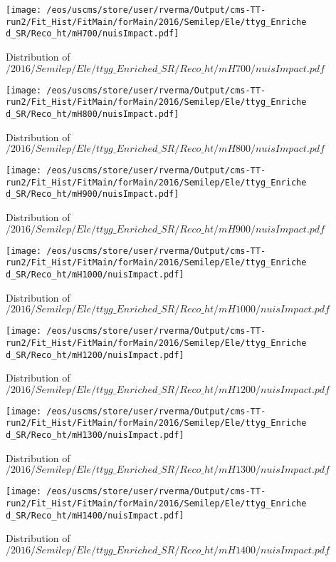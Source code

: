 \begin{figure}
\centering
\texttt{[image: /eos/uscms/store/user/rverma/Output/cms-TT-run2/Fit\_Hist/FitMain/forMain/2016/Semilep/Ele/ttyg\_Enriched\_SR/Reco\_ht/mH700/nuisImpact.pdf]}
\caption{Distribution of $/2016/Semilep/Ele/ttyg\_Enriched\_SR/Reco\_ht/mH700/nuisImpact.pdf$}
\end{figure}

\begin{figure}
\centering
\texttt{[image: /eos/uscms/store/user/rverma/Output/cms-TT-run2/Fit\_Hist/FitMain/forMain/2016/Semilep/Ele/ttyg\_Enriched\_SR/Reco\_ht/mH800/nuisImpact.pdf]}
\caption{Distribution of $/2016/Semilep/Ele/ttyg\_Enriched\_SR/Reco\_ht/mH800/nuisImpact.pdf$}
\end{figure}

\begin{figure}
\centering
\texttt{[image: /eos/uscms/store/user/rverma/Output/cms-TT-run2/Fit\_Hist/FitMain/forMain/2016/Semilep/Ele/ttyg\_Enriched\_SR/Reco\_ht/mH900/nuisImpact.pdf]}
\caption{Distribution of $/2016/Semilep/Ele/ttyg\_Enriched\_SR/Reco\_ht/mH900/nuisImpact.pdf$}
\end{figure}

\begin{figure}
\centering
\texttt{[image: /eos/uscms/store/user/rverma/Output/cms-TT-run2/Fit\_Hist/FitMain/forMain/2016/Semilep/Ele/ttyg\_Enriched\_SR/Reco\_ht/mH1000/nuisImpact.pdf]}
\caption{Distribution of $/2016/Semilep/Ele/ttyg\_Enriched\_SR/Reco\_ht/mH1000/nuisImpact.pdf$}
\end{figure}

\begin{figure}
\centering
\texttt{[image: /eos/uscms/store/user/rverma/Output/cms-TT-run2/Fit\_Hist/FitMain/forMain/2016/Semilep/Ele/ttyg\_Enriched\_SR/Reco\_ht/mH1200/nuisImpact.pdf]}
\caption{Distribution of $/2016/Semilep/Ele/ttyg\_Enriched\_SR/Reco\_ht/mH1200/nuisImpact.pdf$}
\end{figure}

\begin{figure}
\centering
\texttt{[image: /eos/uscms/store/user/rverma/Output/cms-TT-run2/Fit\_Hist/FitMain/forMain/2016/Semilep/Ele/ttyg\_Enriched\_SR/Reco\_ht/mH1300/nuisImpact.pdf]}
\caption{Distribution of $/2016/Semilep/Ele/ttyg\_Enriched\_SR/Reco\_ht/mH1300/nuisImpact.pdf$}
\end{figure}

\begin{figure}
\centering
\texttt{[image: /eos/uscms/store/user/rverma/Output/cms-TT-run2/Fit\_Hist/FitMain/forMain/2016/Semilep/Ele/ttyg\_Enriched\_SR/Reco\_ht/mH1400/nuisImpact.pdf]}
\caption{Distribution of $/2016/Semilep/Ele/ttyg\_Enriched\_SR/Reco\_ht/mH1400/nuisImpact.pdf$}
\end{figure}


